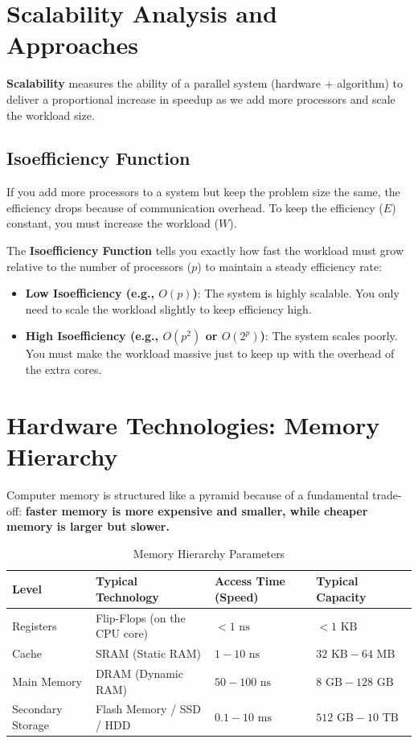 \documentclass[11pt,a4paper]{article}
\begin{document}
\section{Scalability Analysis and Approaches}
\textbf{Scalability} measures the ability of a parallel system (hardware + algorithm) to deliver a proportional increase in speedup as we add more processors and scale the workload size.

\subsection{Isoefficiency Function}
If you add more processors to a system but keep the problem size the same, the efficiency drops because of communication overhead. To keep the efficiency ($E$) constant, you must increase the workload ($W$).

The \textbf{Isoefficiency Function} tells you exactly how fast the workload must grow relative to the number of processors ($p$) to maintain a steady efficiency rate:
\begin{itemize}
    \item \textbf{Low Isoefficiency (e.g., $O(p)$)}: The system is highly scalable. You only need to scale the workload slightly to keep efficiency high.
    \item \textbf{High Isoefficiency (e.g., $O(p^2)$ or $O(2^p)$)}: The system scales poorly. You must make the workload massive just to keep up with the overhead of the extra cores.
\end{itemize}

\section{Hardware Technologies: Memory Hierarchy}
Computer memory is structured like a pyramid because of a fundamental trade-off: \textbf{faster memory is more expensive and smaller, while cheaper memory is larger but slower.}

\begin{table}[h]
\centering
\caption{Memory Hierarchy Parameters}
\begin{tabularx}{\textwidth}{@{}lXXX@{}}
\toprule
\textbf{Level} & \textbf{Typical Technology} & \textbf{Access Time (Speed)} & \textbf{Typical Capacity} \\ \midrule
Registers & Flip-Flops (on the CPU core) & $< 1 \text{ ns}$ & $< 1 \text{ KB}$ \\
Cache & SRAM (Static RAM) & $1 - 10 \text{ ns}$ & $32 \text{ KB} - 64 \text{ MB}$ \\
Main Memory & DRAM (Dynamic RAM) & $50 - 100 \text{ ns}$ & $8 \text{ GB} - 128 \text{ GB}$ \\
Secondary Storage & Flash Memory / SSD / HDD & $0.1 - 10 \text{ ms}$ & $512 \text{ GB} - 10 \text{ TB}$ \\ \bottomrule
\end{tabularx}
\end{table}
\end{document}

